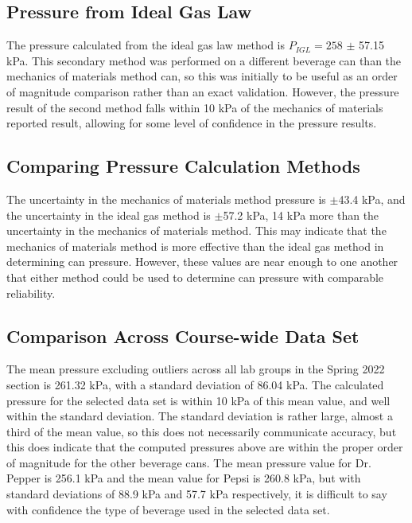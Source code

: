 \documentclass[10pt,journal,letterpaper]{IEEEtran}
\begin{document}
\subsection{Pressure from Ideal Gas Law}

The pressure calculated from the ideal gas law method is $P_{IGL}=258$ $\pm$ 57.15 kPa.
This secondary method was performed on a different beverage can than the mechanics of materials method can, so this was initially to be useful as an order of magnitude comparison rather than an exact validation.
However, the pressure result of the second method falls within 10 kPa of the mechanics of materials reported result, allowing for some level of confidence in the pressure results.

\subsection{Comparing Pressure Calculation Methods}

The uncertainty in the mechanics of materials method pressure is $\pm$43.4 kPa, and the uncertainty in the ideal gas method is $\pm$57.2 kPa, 14 kPa more than the uncertainty in the mechanics of materials method.
This may indicate that the mechanics of materials method is more effective than the ideal gas method in determining can pressure.
However, these values are near enough to one another that either method could be used to determine can pressure with comparable reliability. 

\subsection{Comparison Across Course-wide Data Set}

The mean pressure excluding outliers across all lab groups in the Spring 2022 section is 261.32 kPa, with a standard deviation of 86.04 kPa.
The calculated pressure for the selected data set is within 10 kPa of this mean value, and well within the standard deviation.
The standard deviation is rather large, almost a third of the mean value, so this does not necessarily communicate accuracy, but this does indicate that the computed pressures above are within the proper order of magnitude for the other beverage cans.
The mean pressure value for Dr. Pepper is 256.1 kPa and the mean value for Pepsi is 260.8 kPa, but with standard deviations of 88.9 kPa and 57.7 kPa respectively, it is difficult to say with confidence the type of beverage used in the selected data set.
\end{document}
